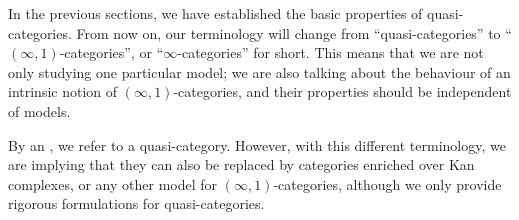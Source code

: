 In the previous sections,
we have established the basic properties of quasi-categories.
From now on, our terminology will change from ``quasi-categories''
to ``$(\infty,1)$-categories'', or ``$\infty$-categories'' for short.
This means that we are not only studying one particular model;
we are also talking about the behaviour of an intrinsic notion of $(\infty,1)$-categories,
and their properties should be independent of models.

By an , we refer to a quasi-category.
However, with this different terminology, we are implying that they can also be replaced by
categories enriched over Kan complexes, or any other model for $(\infty,1)$-categories,
although we only provide rigorous formulations for quasi-categories.
